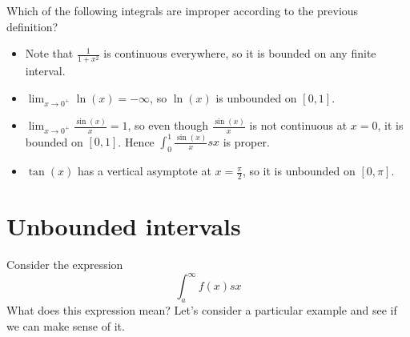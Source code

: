 \documentclass{ximera}
\begin{document}
\begin{question}
  Which of the following integrals are improper according to the previous definition?
  \begin{selectAll}
  \end{selectAll}

\begin{feedback}
\begin{itemize}
\item Note that $\frac{1}{1+x^2}$ is continuous everywhere, so it is bounded on any finite interval. 
\item $\lim_{x \to 0^+} \ln(x) = -\infty$, so $\ln(x)$ is unbounded on $[0,1]$.
\item $\lim_{x \to 0^+} \frac{\sin(x)}{x} = 1$, so even though $\frac{\sin(x)}{x}$ is not continuous at $x=0$, it is bounded on $[0,1]$.  Hence $\int_0^1 \frac{\sin(x)}{x} sx$ is proper.
\item $\tan(x)$ has a vertical asymptote at $x=\frac{\pi}{2}$, so it is unbounded on $[0,\pi]$.
\end{itemize}
\end{feedback}
\end{question}





\section{Unbounded intervals}


Consider the expression
\[ 
\int_{a}^{\infty} f(x) sx
\]
What does this expression mean?  Let's consider a particular example and see if we can make sense of it.
\end{document}
